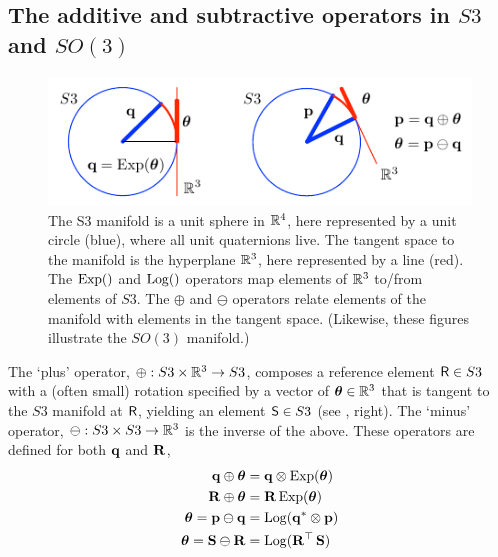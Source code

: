 


\subsection{The additive and subtractive operators in $S3$ and $SO(3)$}

\begin{figure}[tb]
\begin{center}
\includegraphics{figures/manifold}
\caption{The S3 manifold is a unit sphere in ${\mathbb R}^4$, here represented by a unit circle (blue),  where all unit quaternions live. The tangent space to the manifold is the hyperplane ${\mathbb R}^3$, here represented by a line (red). The $\operatorname*{Exp}()$ and $\operatorname*{Log}()$ operators map elements of ${\mathbb R}^3$ to/from elements of $S3$. The $\oplus$ and $\ominus$ operators relate elements of the manifold with elements in the tangent space. (Likewise, these figures illustrate the $SO(3)$ manifold.)}
\label{fig:manifold}
\end{center}
\end{figure}




The `plus' operator, $\oplus:S3\times{\mathbb R}^3\to S3$, composes a reference element $\mathsf R\in S3$ with a (often small) rotation specified by a vector of ${{\bm \theta}}\in{\mathbb R}^3$ that is tangent to the $S3$ manifold at $\mathsf R$, yielding an element $\mathsf S\in S3$ (see , right). 
%
%
The `minus' operator, $\ominus:S3\times S3\to{\mathbb R}^3$ is the inverse of the above.
%
%
These operators are defined for both ${\bf q}$ and ${\bf R}$,
%
\begin{align}
{\bf q}\oplus{{\bm \theta}}  &= {\bf q}\otimes\operatorname*{Exp}({{\bm \theta}}) \\
{\bf R}\oplus {{\bm \theta}} &= {\bf R}\operatorname*{Exp}({{\bm \theta}}) \\
{{\bm \theta}} = {\bf p}\ominus{\bf q} &= \operatorname*{Log}({\bf q}^*\otimes{\bf p}) \\
{{\bm \theta}} = {\bf S}\ominus{\bf R} &= \operatorname*{Log}({\bf R}^{\top}\,{\bf S})                         
\end{align}


